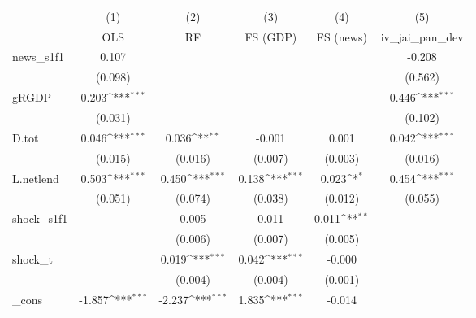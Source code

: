 {
\def\sym#1{\ifmmode^{#1}\else\(^{#1}\)\fi}
\begin{tabular}{l*{5}{c}}
\toprule
            &\multicolumn{1}{c}{(1)}&\multicolumn{1}{c}{(2)}&\multicolumn{1}{c}{(3)}&\multicolumn{1}{c}{(4)}&\multicolumn{1}{c}{(5)}\\
            &\multicolumn{1}{c}{OLS}&\multicolumn{1}{c}{RF}&\multicolumn{1}{c}{FS (GDP)}&\multicolumn{1}{c}{FS (news)}&\multicolumn{1}{c}{iv\_jai\_pan\_dev}\\
\midrule
news\_s1f1   &       0.107         &                     &                     &                     &      -0.208         \\
            &     (0.098)         &                     &                     &                     &     (0.562)         \\
\addlinespace
gRGDP       &       0.203\sym{***}&                     &                     &                     &       0.446\sym{***}\\
            &     (0.031)         &                     &                     &                     &     (0.102)         \\
\addlinespace
D.tot       &       0.046\sym{***}&       0.036\sym{**} &      -0.001         &       0.001         &       0.042\sym{***}\\
            &     (0.015)         &     (0.016)         &     (0.007)         &     (0.003)         &     (0.016)         \\
\addlinespace
L.netlend   &       0.503\sym{***}&       0.450\sym{***}&       0.138\sym{***}&       0.023\sym{*}  &       0.454\sym{***}\\
            &     (0.051)         &     (0.074)         &     (0.038)         &     (0.012)         &     (0.055)         \\
\addlinespace
shock\_s1f1  &                     &       0.005         &       0.011         &       0.011\sym{**} &                     \\
            &                     &     (0.006)         &     (0.007)         &     (0.005)         &                     \\
\addlinespace
shock\_t     &                     &       0.019\sym{***}&       0.042\sym{***}&      -0.000         &                     \\
            &                     &     (0.004)         &     (0.004)         &     (0.001)         &                     \\
\addlinespace
\_cons      &      -1.857\sym{***}&      -2.237\sym{***}&       1.835\sym{***}&      -0.014         &                     \\

\end{tabular}}
